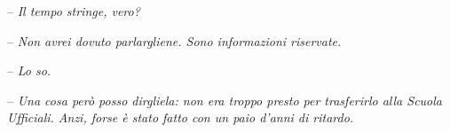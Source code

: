 {-- \emph{Il tempo stringe, vero?}}

{-- \emph{Non avrei dovuto parlargliene. Sono informazioni riservate.}}

{-- \emph{Lo so.}}

{-- \emph{Una cosa però posso dirgliela: non era troppo presto per
		trasferirlo alla Scuola Ufficiali. Anzi, forse è stato fatto con un paio
		d'anni di ritardo.}}

\label{Orsonux20Scottux20Cardux20-ux20Ilux20Giocoux20Diux20Enderux20-ux20BY_SLY70A1_split_015.htm}{}
